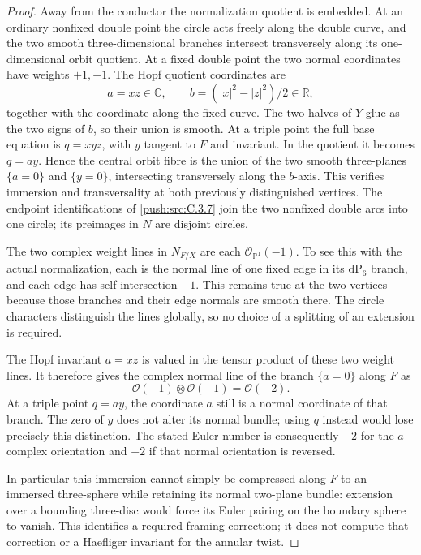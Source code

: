 \begin{proof}
Away from the conductor the normalization quotient is embedded.
At an ordinary nonfixed double point the circle acts freely along
the double curve, and the two smooth three-dimensional branches
intersect transversely along its one-dimensional orbit quotient.
At a fixed double point the two normal coordinates have weights
\(+1,-1\). The Hopf quotient coordinates are
\[
 a=xz\in\mathbb C,\qquad
 b=(|x|^2-|z|^2)/2\in\mathbb R,
\]
together with the coordinate along the fixed curve. The two
halves of \(Y\) glue as the two signs of \(b\), so their
union is smooth. At a triple point the full base equation is
\(q=xyz\), with \(y\) tangent to \(F\) and invariant.
In the quotient it becomes \(q=ay\). Hence the central orbit
fibre is the union of the two smooth three-planes
\(\{a=0\}\) and \(\{y=0\}\), intersecting transversely
along the \(b\)-axis. This verifies immersion and transversality
at both previously distinguished vertices. The endpoint
identifications of \ref{push:src:C.3.7} join the two nonfixed double arcs into
one circle; its preimages in \(N\) are disjoint circles.

The two complex weight lines in \(N_{F/X}\) are each
\(\mathcal O_{\mathbb P^1}(-1)\). To see this with the actual
normalization, each is the normal line of one fixed edge in its
\(\mathrm{dP}_6\) branch, and each edge has self-intersection
\(-1\). This remains true at the two vertices because those
branches and their edge normals are smooth there. The circle
characters distinguish the lines globally, so no choice of a
splitting of an extension is required.

The Hopf invariant \(a=xz\) is valued in the tensor product
of these two weight lines. It therefore gives the complex normal
line of the branch \(\{a=0\}\) along \(F\) as
\[
 \mathcal O(-1)\otimes\mathcal O(-1)=\mathcal O(-2).
\]
At a triple point \(q=ay\), the coordinate \(a\) still is
a normal coordinate of that branch. The zero of \(y\) does
not alter its normal bundle; using \(q\) instead would lose
precisely this distinction. The stated Euler number is consequently
\(-2\) for the \(a\)-complex orientation and \(+2\) if that
normal orientation is reversed.

In particular this immersion cannot simply be compressed along
\(F\) to an immersed three-sphere while retaining its normal
two-plane bundle: extension over a bounding three-disc would force
its Euler pairing on the boundary sphere to vanish. This identifies
a required framing correction; it does not compute that correction
or a Haefliger invariant for the annular twist.
\end{proof}


